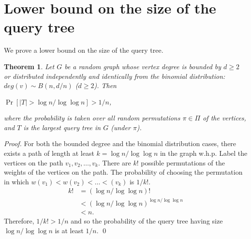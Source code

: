 \documentclass[english, oribibl]{llncs}
\newtheorem{theorem}{Theorem}[section]
\begin{document}
\section{Lower bound on the size of the query tree}
\label{section:lower_bound}
We prove a lower bound on the size of the query tree.
\begin{theorem}
\label{thm:lower_bound}
Let $G$ be a random graph whose vertex degree is bounded by $d \geq 2$ or distributed independently and identically from the binomial distribution:  $deg(v) \sim B(n,d/n)$ ($d \geq 2$). Then
\begin{center}
$\Pr[|T|>\log{n} / \log\log{n}]>1/n$,
\end{center}
where the probability is taken over all random permutations $\pi \in \Pi$ of the vertices, and $T$ is the largest query tree in $G$ (under $\pi$).
\end{theorem}\begin{proof}

For both the bounded degree and the binomial distribution cases, there exists a path of length at least $k = \log{n} / \log\log{n}$ in the graph  w.h.p. Label the vertices on the path $v_1, v_2, \ldots, v_k$. There are $k!$ possible permutations of the weights of the vertices on the path. The probability of choosing the permutation in which $w(v_1)<w(v_2)<\ldots<(v_k)$ is $1/k!$.
\begin{align*}
k! & = (\log{n} / \log\log{n})!\\
& < (\log{n} / \log\log{n})^{\log{n} / \log\log{n}}\\
&<n.
\end{align*}
Therefore, $1/k!>1/n$ and so the probability of the query tree having size\\ $\log{n} / \log\log{n}$ is at least $1/n$. \qed

\end{proof}
\end{document}
